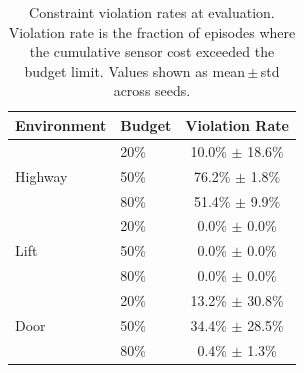\begin{table}[h]
    \centering
    \caption{Constraint violation rates at evaluation. Violation rate is the fraction of episodes where the cumulative sensor cost exceeded the budget limit. Values shown as mean\,$\pm$\,std across seeds.}
    \label{tab:constraint_violations}
    \begin{tabular}{llc}
        \toprule
        \textbf{Environment} & \textbf{Budget} & \textbf{Violation Rate} \\
        \midrule
        \multirow{3}{*}{Highway} & 20\% & 10.0\% $\pm$ 18.6\% \\
         & 50\% & 76.2\% $\pm$ 1.8\% \\
         & 80\% & 51.4\% $\pm$ 9.9\% \\
        \midrule
        \multirow{3}{*}{Lift} & 20\% & 0.0\% $\pm$ 0.0\% \\
         & 50\% & 0.0\% $\pm$ 0.0\% \\
         & 80\% & 0.0\% $\pm$ 0.0\% \\
        \midrule
        \multirow{3}{*}{Door} & 20\% & 13.2\% $\pm$ 30.8\% \\
         & 50\% & 34.4\% $\pm$ 28.5\% \\
         & 80\% & 0.4\% $\pm$ 1.3\% \\
        \bottomrule
    \end{tabular}
\end{table}
